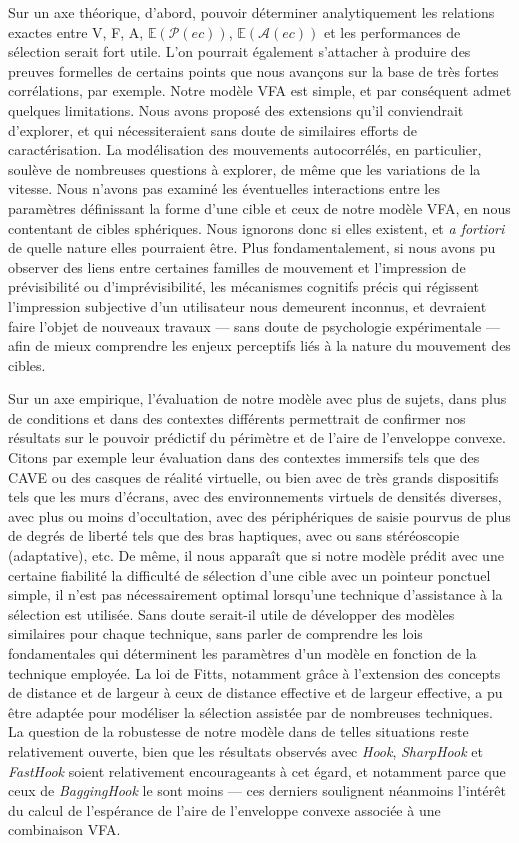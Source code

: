 	Sur un axe théorique, d'abord, pouvoir déterminer analytiquement les relations exactes entre V, F, A, $\mathbb{E}(\mathcal{P}(ec))$, $\mathbb{E}(\mathcal{A}(ec))$ et les performances de sélection serait fort utile. L'on pourrait également s'attacher à produire des preuves formelles de certains points que nous avançons sur la base de très fortes corrélations, par exemple. Notre modèle VFA est simple, et par conséquent admet quelques limitations. Nous avons proposé des extensions qu'il conviendrait d'explorer, et qui nécessiteraient sans doute de similaires efforts de caractérisation. La modélisation des mouvements autocorrélés, en particulier, soulève de nombreuses questions à explorer, de même que les variations de la vitesse. Nous n'avons pas examiné les éventuelles interactions entre les paramètres définissant la forme d'une cible et ceux de notre modèle VFA, en nous contentant de cibles sphériques. Nous ignorons donc si elles existent, et \emph{a fortiori} de quelle nature elles pourraient être. Plus fondamentalement, si nous avons pu observer des liens entre certaines familles de mouvement et l'impression de prévisibilité ou d'imprévisibilité, les mécanismes cognitifs précis qui régissent l'impression subjective d'un utilisateur nous demeurent inconnus, et devraient faire l'objet de nouveaux travaux --- sans doute de psychologie expérimentale --- afin de mieux comprendre les enjeux perceptifs liés à la nature du mouvement des cibles.
	
	Sur un axe empirique, l'évaluation de notre modèle avec plus de sujets, dans plus de conditions et dans des contextes différents permettrait de confirmer nos résultats sur le pouvoir prédictif du périmètre et de l'aire de l'enveloppe convexe. Citons par exemple leur évaluation dans des contextes immersifs tels que des CAVE ou des casques de réalité virtuelle, ou bien avec de très grands dispositifs tels que les murs d'écrans, avec des environnements virtuels de densités diverses, avec plus ou moins d'occultation, avec des périphériques de saisie pourvus de plus de degrés de liberté tels que des bras haptiques, avec ou sans stéréoscopie (adaptative), etc. De même, il nous apparaît que si notre modèle prédit avec une certaine fiabilité la difficulté de sélection d'une cible avec un pointeur ponctuel simple, il n'est pas nécessairement optimal lorsqu'une technique d'assistance à la sélection est utilisée. Sans doute serait-il utile de développer des modèles similaires pour chaque technique, sans parler de comprendre les lois fondamentales qui déterminent les paramètres d'un modèle en fonction de la technique employée. La loi de Fitts, notamment grâce à l'extension des concepts de distance et de largeur à ceux de distance effective et de largeur effective, a pu être adaptée pour modéliser la sélection assistée par de nombreuses techniques. La question de la robustesse de notre modèle dans de telles situations reste relativement ouverte, bien que les résultats observés avec \emph{Hook}, \emph{SharpHook} et \emph{FastHook} soient relativement encourageants à cet égard, et notamment parce que ceux de \emph{BaggingHook} le sont moins --- ces derniers soulignent néanmoins l'intérêt du calcul de l'espérance de l'aire de l'enveloppe convexe associée à une combinaison VFA.
	

